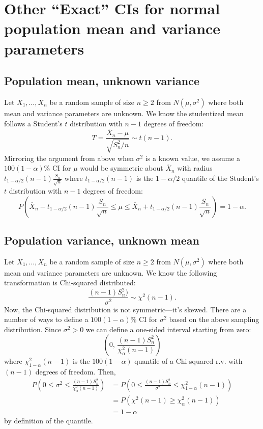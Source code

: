 \documentclass[
]{book}
\begin{document}
\hypertarget{other-exact-cis-for-normal-population-mean-and-variance-parameters}{%
\section{Other ``Exact'' CIs for normal population mean and variance parameters}\label{other-exact-cis-for-normal-population-mean-and-variance-parameters}}

\hypertarget{population-mean-unknown-variance}{%
\subsection{Population mean, unknown variance}\label{population-mean-unknown-variance}}

Let \(X_1, \ldots, X_n\) be a random sample of size \(n\geq 2\) from \(N(\mu, \sigma^2)\) where both mean and variance parameters are unknown. We know the studentized mean follows a Student's \(t\) distribution with \(n-1\) degrees of freedom:
\[T = \frac{\overline X_n - \mu}{\sqrt{S_n^2/n}}\sim t(n-1).\]
Mirroring the argument from above when \(\sigma^2\) is a known value, we assume a \(100(1-\alpha)\%\) CI for \(\mu\) would be symmetric about \(\overline X_n\) with radius \(t_{1-\alpha/2}(n-1) \frac{S_n}{\sqrt{n}}\) where \(t_{1-\alpha/2}(n-1)\) is the \(1-\alpha/2\) quantile of the Student's \(t\) distribution with \(n-1\) degrees of freedom:
\[P\left(\overline X_n - t_{1-\alpha/2}(n-1) \frac{S_n}{\sqrt{n}} \leq \mu \leq \overline X_n + t_{1-\alpha/2}(n-1) \frac{S_n}{\sqrt{n}}\right) = 1-\alpha.\]

\hypertarget{population-variance-unknown-mean}{%
\subsection{Population variance, unknown mean}\label{population-variance-unknown-mean}}

Let \(X_1, \ldots, X_n\) be a random sample of size \(n\geq 2\) from \(N(\mu, \sigma^2)\) where both mean and variance parameters are unknown. We know the following transformation is Chi-squared distributed:
\[\frac{(n-1)S_n^2)}{\sigma^2}\sim \chi^2(n-1).\]
Now, the Chi-squared distribution is not symmetric---it's skewed. There are a number of ways to define a \(100(1-\alpha)\%\) CI for \(\sigma^2\) based on the above sampling distribution. Since \(\sigma^2 > 0\) we can define a one-sided interval starting from zero:
\[\left(0, \, \frac{(n-1)S_n^2}{\chi^2_{\alpha}(n-1)}\right)\]
where \(\chi^2_{1-\alpha}(n-1)\) is the \(100(1-\alpha)\) quantile of a Chi-squared r.v. with \((n-1)\) degrees of freedom. Then,
\begin{align*}
P(0 \leq \sigma^2 \leq \frac{(n-1)S_n^2}{\chi^2_{\alpha}(n-1)}) &= P(0\leq \frac{(n-1)S_n^2}{\sigma^2} \leq \chi^2_{1-\alpha}(n-1))\\
& = P(\chi^2(n-1) \geq \chi^2_{\alpha}(n-1))\\
&= 1-\alpha
\end{align*}
by definition of the quantile.
\end{document}
